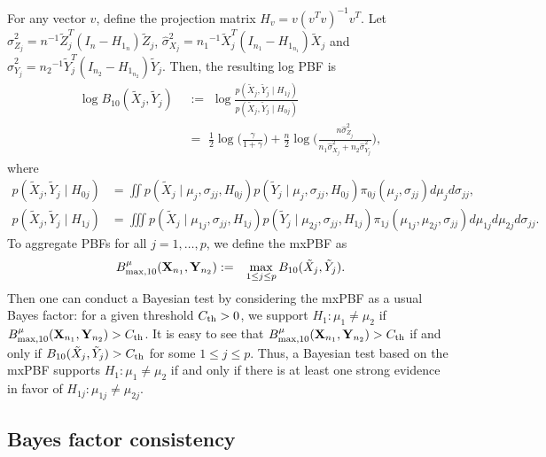 \documentclass[11pt]{article}
\newcommand{\bean}{\begin{eqnarray}}
\newcommand{\eean}{\end{eqnarray}}
\newcommand{\bfX}{{\bf X}}
\newcommand{\bfY}{{\bf Y}}
\newcommand{\what}{\widehat}
\begin{document}
For any vector $v$, define the projection matrix $H_v = v (v^T v)^{-1} v^T$.
Let $\what{\sigma}^2_{Z_j} = n^{-1} \tilde{Z}_j^T (I_n -  H_{1_n}) \tilde{Z}_j$, $\what{\sigma}^2_{X_j} = {n_1}^{-1} \tilde{X}_j^T (I_{n_1} -  H_{1_{n_1}}) \tilde{X}_j$ and $\what{\sigma}^2_{Y_j} = {n_2}^{-1} \tilde{Y}_j^T (I_{n_2} -  H_{1_{n_2}}) \tilde{Y}_j$.
Then, the resulting log PBF is
\begin{equation}
	\begin{split}\label{twomean_PBF}
		\log B_{10} (\tilde{X}_j, \tilde{Y}_j) 
		\,\,&:=\,\,  \log  \frac{p(\tilde{X}_j, \tilde{Y}_j \mid H_{1j})}{p(\tilde{X}_j, \tilde{Y}_j \mid H_{0j})}    \\
		\,\,&=\,\, \frac{1}{2}\log \Big(\frac{\gamma}{1+\gamma} \Big) + \frac{n}{2} \log \Bigg( \frac{ n\what{\sigma}^2_{Z_j} }{ n_1 \what{\sigma}^2_{X_j} + n_2 \what{\sigma}^2_{Y_j} }  \Bigg),
	\end{split}	
\end{equation}
where 
\begin{align*}
	p(\tilde{X}_j, \tilde{Y}_j \mid H_{0j}) &= \iint p(\tilde{X}_j \mid \mu_{j},\sigma_{jj}, H_{0j}) p(\tilde{Y}_j \mid \mu_{j},\sigma_{jj}, H_{0j}) \pi_{0j}(\mu_{j},\sigma_{jj}) d \mu_{j} d\sigma_{jj}   , \\
	p(\tilde{X}_j, \tilde{Y}_j \mid H_{1j}) &= \iiint p(\tilde{X}_j \mid \mu_{1j},\sigma_{jj}, H_{1j}) p(\tilde{Y}_j \mid \mu_{2j},\sigma_{jj}, H_{1j}) \pi_{1j}(\mu_{1j},\mu_{2j},\sigma_{jj}) d \mu_{1j} d\mu_{2j} d\sigma_{jj} .	
\end{align*}
To aggregate PBFs for all $j=1,\ldots, p$, we define the mxPBF as
\bean\label{mxPBF_mean}
B_{\max,10}^{\mu}(\bfX_{n_1}, \bfY_{n_2}) &:=& \max_{1\le j\le p} B_{10}(\tilde{X}_j, \tilde{Y}_j) .
\eean
Then one can conduct a Bayesian test by considering the mxPBF as a usual Bayes factor: for a given threshold $C_{\rm th}>0$, we support $H_1:\mu_1 \neq \mu_2$ if $B_{\max,10}^{\mu}(\bfX_{n_1}, \bfY_{n_2})  > C_{\rm th}$.
It is easy to see that $B_{\max,10}^{\mu}(\bfX_{n_1}, \bfY_{n_2})  > C_{\rm th}$ if and only if $B_{10}(\tilde{X}_j, \tilde{Y}_j)  > C_{\rm th}$ for some $1\le j\le p$.
Thus, a Bayesian test based on the mxPBF supports $H_1:\mu_1\neq \mu_2$ if and only if there is at least one strong evidence in favor of  $H_{1j}:\mu_{1j}\neq \mu_{2j}$.


\subsection{Bayes factor consistency}\label{subsec:mxPBF_consistency_mean}
\end{document}
